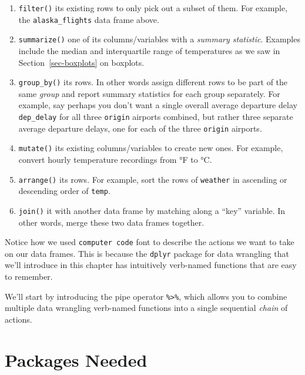\documentclass[
  letterpaper,
  DIV=11,
  numbers=noendperiod]{scrreprt}
\theoremstyle{definition}
\theoremstyle{remark}
\begin{document}
\begin{enumerate}
\def\labelenumi{\arabic{enumi}.}
\item
  \texttt{filter()} its existing rows to only pick out a subset of them.
  For example, the \texttt{alaska\_flights} data frame above.
\item
  \texttt{summarize()} one of its columns/variables with a \emph{summary
  statistic}. Examples include the median and interquartile range of
  temperatures as we saw in Section~\ref{sec-boxplots} on boxplots.
\item
  \texttt{group\_by()} its rows. In other words assign different rows to
  be part of the same \emph{group} and report summary statistics for
  each group separately. For example, say perhaps you don't want a
  single overall average departure delay \texttt{dep\_delay} for all
  three \texttt{origin} airports combined, but rather three separate
  average departure delays, one for each of the three \texttt{origin}
  airports.
\item
  \texttt{mutate()} its existing columns/variables to create new ones.
  For example, convert hourly temperature recordings from °F to °C.
\item
  \texttt{arrange()} its rows. For example, sort the rows of
  \texttt{weather} in ascending or descending order of \texttt{temp}.
\item
  \texttt{join()} it with another data frame by matching along a ``key''
  variable. In other words, merge these two data frames together.
\end{enumerate}

Notice how we used \texttt{computer\ code} font to describe the actions
we want to take on our data frames. This is because the \texttt{dplyr}
package for data wrangling that we'll introduce in this chapter has
intuitively verb-named functions that are easy to remember.

We'll start by introducing the pipe operator
\texttt{\%\textgreater{}\%}, which allows you to combine multiple data
wrangling verb-named functions into a single sequential \emph{chain} of
actions.

\hypertarget{packages-needed-1}{%
\section*{Packages Needed}\label{packages-needed-1}}

\end{document}
